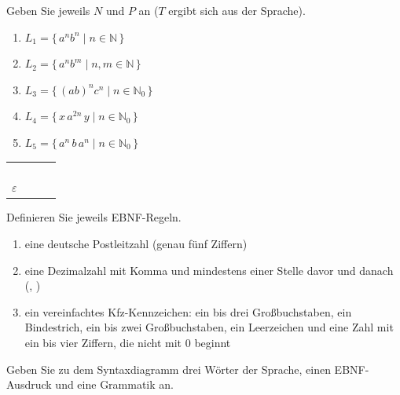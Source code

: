 Geben Sie jeweils $N$ und $P$ an ($T$ ergibt sich aus der Sprache).
\begin{enumerate}[label=\alph*)]
\item $L_1 = \{\, a^n b^n \mid n \in \mathbb{N} \,\}$
\item $L_2 = \{\, a^n b^m \mid n, m \in \mathbb{N} \,\}$
\item $L_3 = \{\, (ab)^n c^n \mid n \in \mathbb{N}_0 \,\}$
\item $L_4 = \{\, x\,a^{2n}\,y \mid n \in \mathbb{N}_0 \,\}$
\item $L_5 = \{\, a^n\,b\,a^n \mid n \in \mathbb{N}_0 \,\}$
\end{enumerate}

\begin{center}
\renewcommand{\arraystretch}{1.4}
\begin{tabular}{|l|C{2.8cm}|C{2.8cm}|C{2.8cm}|}
\hline
 &  &  &  \\ \hline
{} & & & \\ \hline
{} & & & \\ \hline
{} & & & \\ \hline
{} & & & \\ \hline
$\varepsilon$ & & & \\ \hline
\end{tabular}
\end{center}

Definieren Sie jeweils EBNF-Regeln.
\begin{enumerate}[label=\alph*)]
\item eine deutsche Postleitzahl (genau fünf Ziffern)
\item eine Dezimalzahl mit Komma und mindestens einer Stelle davor und danach (, )
\item ein vereinfachtes Kfz-Kennzeichen: ein bis drei Großbuchstaben, ein Bindestrich, ein bis zwei Großbuchstaben, ein Leerzeichen und eine Zahl mit ein bis vier Ziffern, die nicht mit 0 beginnt
\end{enumerate}

Geben Sie zu dem Syntaxdiagramm drei Wörter der Sprache, einen EBNF-Ausdruck und eine Grammatik an.
\begin{center}
\end{center}

